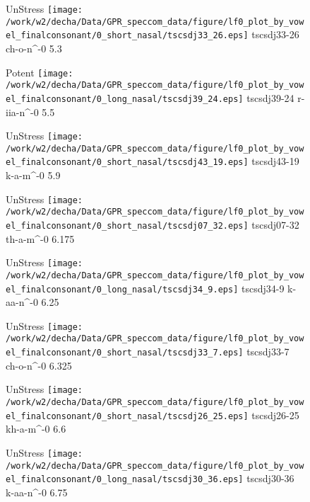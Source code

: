 \documentclass{article}
\begin{document}
\begin{figure}[t]
\begin{minipage}[b]{.24\textwidth}
UnStress
\centering
\texttt{[image: /work/w2/decha/Data/GPR\_speccom\_data/figure/lf0\_plot\_by\_vowel\_finalconsonant/0\_short\_nasal/tscsdj33\_26.eps]}
tscsdj33-26 ch-o-n\textasciicircum-0 5.3
\end{minipage}
\begin{minipage}[b]{.24\textwidth}
\colorbox{Apricot}{Potent}
\centering
\texttt{[image: /work/w2/decha/Data/GPR\_speccom\_data/figure/lf0\_plot\_by\_vowel\_finalconsonant/0\_long\_nasal/tscsdj39\_24.eps]}
tscsdj39-24 r-iia-n\textasciicircum-0 5.5
\end{minipage}
\begin{minipage}[b]{.24\textwidth}
UnStress
\centering
\texttt{[image: /work/w2/decha/Data/GPR\_speccom\_data/figure/lf0\_plot\_by\_vowel\_finalconsonant/0\_short\_nasal/tscsdj43\_19.eps]}
tscsdj43-19 k-a-m\textasciicircum-0 5.9
\end{minipage}
\begin{minipage}[b]{.24\textwidth}
UnStress
\centering
\texttt{[image: /work/w2/decha/Data/GPR\_speccom\_data/figure/lf0\_plot\_by\_vowel\_finalconsonant/0\_short\_nasal/tscsdj07\_32.eps]}
tscsdj07-32 th-a-m\textasciicircum-0 6.175
\end{minipage}
\end{figure}

\begin{figure}[t]
\begin{minipage}[b]{.24\textwidth}
UnStress
\centering
\texttt{[image: /work/w2/decha/Data/GPR\_speccom\_data/figure/lf0\_plot\_by\_vowel\_finalconsonant/0\_long\_nasal/tscsdj34\_9.eps]}
tscsdj34-9 k-aa-n\textasciicircum-0 6.25
\end{minipage}
\begin{minipage}[b]{.24\textwidth}
UnStress
\centering
\texttt{[image: /work/w2/decha/Data/GPR\_speccom\_data/figure/lf0\_plot\_by\_vowel\_finalconsonant/0\_short\_nasal/tscsdj33\_7.eps]}
tscsdj33-7 ch-o-n\textasciicircum-0 6.325
\end{minipage}
\begin{minipage}[b]{.24\textwidth}
UnStress
\centering
\texttt{[image: /work/w2/decha/Data/GPR\_speccom\_data/figure/lf0\_plot\_by\_vowel\_finalconsonant/0\_short\_nasal/tscsdj26\_25.eps]}
tscsdj26-25 kh-a-m\textasciicircum-0 6.6
\end{minipage}
\begin{minipage}[b]{.24\textwidth}
UnStress
\centering
\texttt{[image: /work/w2/decha/Data/GPR\_speccom\_data/figure/lf0\_plot\_by\_vowel\_finalconsonant/0\_long\_nasal/tscsdj30\_36.eps]}
tscsdj30-36 k-aa-n\textasciicircum-0 6.75
\end{minipage}
\end{figure}
\end{document}
